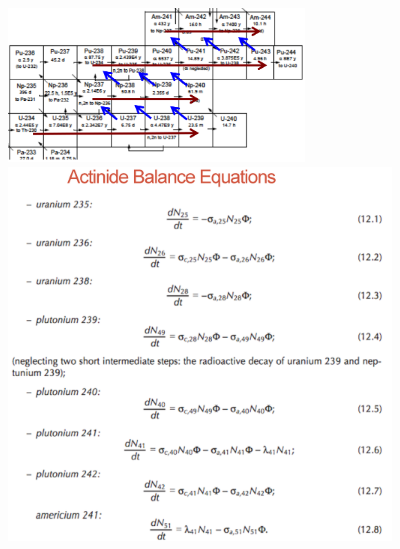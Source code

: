 \documentclass{school-22.211-notes}
\begin{document}
\begin{enumerate}
\begin{figure}[h]
  \centering
  \includegraphics[width=0.7\textwidth]{images/dfs/actinide-model.png}
  \includegraphics[width=4in]{images/dfs/actinide-balance.png}
\end{figure}


\end{enumerate}
\end{document}
